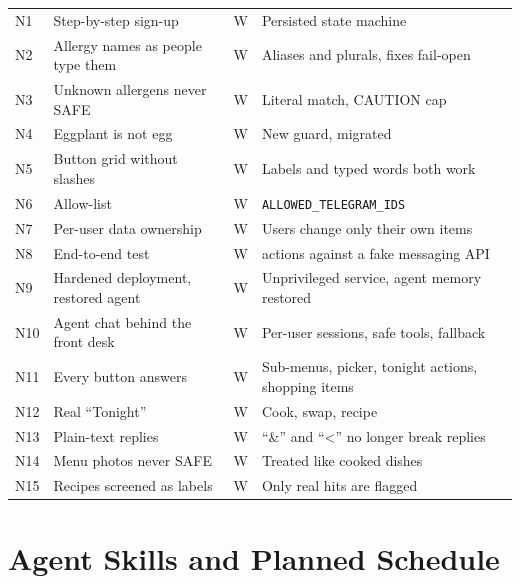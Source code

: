 \documentclass[11pt,a4paper]{article}
\begin{document}
{\begin{longtable}{@{}l >{\raggedright\arraybackslash}p{4.6cm} c >{\raggedright\arraybackslash}p{7.4cm}@{}}
N1 & Step-by-step sign-up & W & Persisted state machine \\
N2 & Allergy names as people type them & W & Aliases and plurals, fixes fail-open \\
N3 & Unknown allergens never SAFE & W & Literal match, CAUTION cap \\
N4 & Eggplant is not egg & W & New guard, migrated \\
N5 & Button grid without slashes & W & Labels and typed words both work \\
N6 & Allow-list & W & \texttt{ALLOWED\_TELEGRAM\_IDS} \\
N7 & Per-user data ownership & W & Users change only their own items \\
N8 & End-to-end test & W & 80 actions against a fake messaging API \\
N9 & Hardened deployment, restored agent & W & Unprivileged service, agent memory restored \\
N10 & Agent chat behind the front desk & W & Per-user sessions, safe tools, fallback \\
N11 & Every button answers & W & Sub-menus, picker, tonight actions, shopping items \\
N12 & Real ``Tonight'' & W & Cook, swap, recipe \\
N13 & Plain-text replies & W & ``\&'' and ``<'' no longer break replies \\
N14 & Menu photos never SAFE & W & Treated like cooked dishes \\
N15 & Recipes screened as labels & W & Only real hits are flagged \\
\bottomrule
\end{longtable}
}

\section{Agent Skills and Planned Schedule}\label{app:skills}
\end{document}
